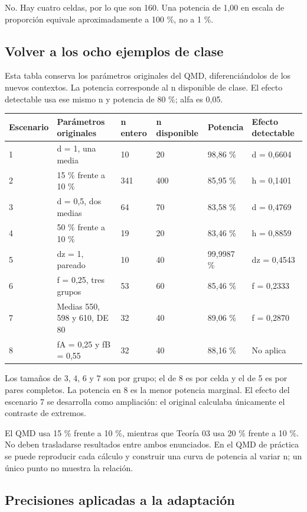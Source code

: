 \documentclass[10pt,a4paper]{article}
\begin{document}
{\small No. Hay cuatro celdas, por lo que son 160. Una potencia de 1,00 en escala de proporción equivale aproximadamente a 100 \%, no a 1 \%.}

\clearpage
\subsection*{Volver a los ocho ejemplos de clase}

Esta tabla conserva los parámetros originales del QMD, diferenciándolos de los nuevos contextos. La potencia corresponde al n disponible de clase. El efecto detectable usa ese mismo n y potencia de 80 \%; alfa es 0,05.

\begingroup\small\begin{longtable}{@{}p{13mm}p{54mm}p{16mm}p{23mm}p{20mm}p{29mm}@{}}\toprule
Escenario & Parámetros originales & n entero & n disponible & Potencia & Efecto detectable\\\midrule
1 & d = 1, una media & 10 & 20 & 98,86 \% & d = 0,6604\\
2 & 15 \% frente a 10 \% & 341 & 400 & 85,95 \% & h = 0,1401\\
3 & d = 0,5, dos medias & 64 & 70 & 83,58 \% & d = 0,4769\\
4 & 50 \% frente a 10 \% & 19 & 20 & 83,46 \% & h = 0,8859\\
5 & dz = 1, pareado & 10 & 40 & 99,9987 \% & dz = 0,4543\\
6 & f = 0,25, tres grupos & 53 & 60 & 85,46 \% & f = 0,2333\\
7 & Medias 550, 598 y 610, DE 80 & 32 & 40 & 89,06 \% & f = 0,2870\\
8 & fA = 0,25 y fB = 0,55 & 32 & 40 & 88,16 \% & No aplica\\
\bottomrule\end{longtable}\endgroup

Los tamaños de 3, 4, 6 y 7 son por grupo; el de 8 es por celda y el de 5 es por pares completos. La potencia en 8 es la menor potencia marginal. El efecto del escenario 7 se desarrolla como ampliación: el original calculaba únicamente el contraste de extremos.

El QMD usa 15 \% frente a 10 \%, mientras que Teoría 03 usa 20 \% frente a 10 \%. No deben trasladarse resultados entre ambos enunciados. En el QMD de práctica se puede reproducir cada cálculo y construir una curva de potencia al variar n; un único punto no muestra la relación.

\clearpage
\subsection*{Precisiones aplicadas a la adaptación}
\end{document}
